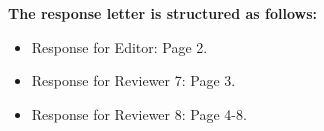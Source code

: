 \documentclass[journal,12pt, onecolumn]{IEEEtran}
\begin{document}
\textbf{The response letter is structured as follows:}\\

\begin{itemize}
    \item [$\bullet$]Response for Editor: Page 2.\\
    \item [$\bullet$]Response for Reviewer 7: Page 3.\\
    \item [$\bullet$]Response for Reviewer 8: Page 4-8.\\
\end{itemize}

\newpage


















\end{document}
